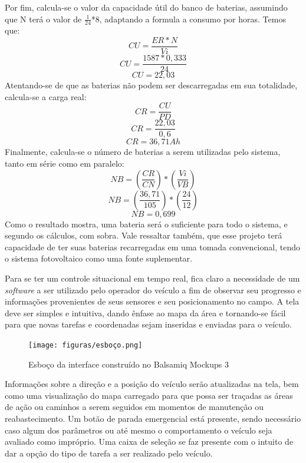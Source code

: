 Por fim, calcula-se o valor da capacidade útil do banco de baterias, assumindo que N terá o valor de $\frac{1}{24}$*8, adaptando a formula a consumo por horas. Temos que:
\[CU=\frac{ER*N}{Vi}\]
\[CU=\frac{1587*0,333}{24}\]
\[CU=22,03\]
Atentando-se de que as baterias não podem ser descarregadas em sua totalidade, calcula-se a carga real:
\[CR=\frac{CU}{PD}\]
\[CR=\frac{22,03}{0,6}\]
\[CR=36,71Ah\]
Finalmente, calcula-se o número de baterias a serem utilizadas pelo sistema, tanto em série como em paralelo:
\[NB=\left ( \frac{CR}{CN} \right )*\left ( \frac{Vi}{VB} \right )\]
\[NB=\left ( \frac{36,71}{105} \right )*\left ( \frac{24}{12} \right )\]
\[NB=0,699\]
Como o resultado mostra, uma bateria será o suficiente para todo o sistema, e segundo os cálculos, com sobra. Vale ressaltar também, que esse projeto terá capacidade de ter suas baterias recarregadas em uma tomada convencional, tendo o sistema fotovoltaico como uma fonte suplementar.

Para se ter um controle situacional em tempo real, fica claro a necessidade de um \textit{software} a ser utilizado pelo operador do veículo a fim de observar seu progresso e informações provenientes de seus sensores e seu posicionamento no campo. A tela deve ser simples e intuitiva, dando ênfase ao mapa da área e tornando-se fácil para que novas tarefas e coordenadas sejam inseridas e enviadas para o veículo.

\begin{figure}[H]
    \centering
    \texttt{[image: figuras/esboço.png]}
    \caption{Esboço da interface construído no Balsamiq Mockups 3}
    \label{fig:balsamiq:esboco}
\end{figure}

Informações sobre a direção e a posição do veículo serão atualizadas na tela, bem como uma visualização do mapa carregado para que possa ser traçadas as áreas de ação  ou caminhos a serem seguidos em momentos de manutenção ou reabastecimento. Um botão de parada emergencial está presente, sendo necessário caso algum dos parâmetros ou até mesmo o comportamento o veículo seja avaliado como impróprio. Uma caixa de seleção se faz presente com o intuito de dar a opção do tipo de tarefa a ser realizado pelo veículo.